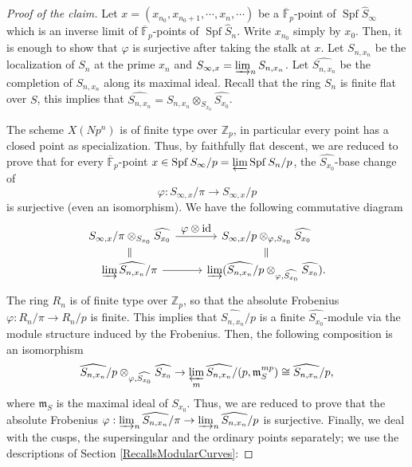 \documentclass[JEP,XML,SOM,Unicode,published]{cedram}
\let\ts\textstyle
\numberwithin{equation}{section}
\theoremstyle{definition}
\newcommand{\bb}[1]{\mathbb{#1}}
\newcommand{\f}[1]{\mathfrak{#1}}
\DeclareMathOperator{\id}{id}
\DeclareMathOperator{\Spf}{Spf}
\newcommand{\mc}[1]{X(Np^{#1})}
\begin{document}
\begin{proof}[Proof of the claim]
Let $x=(x_{n_0}, x_{n_0+1}, \cdots, x_n ,\cdots)$ be a $\overline{\bb{F}}_p$-point of $\Spf \widehat{S}_{\infty}$ which is an inverse limit of $\overline{\bb{F}}_p$-points of $\Spf \widehat{S}_n$. Write $x_{n_0}$ simply by $x_0$. Then, it is enough to show that $\varphi$ is surjective after taking the stalk at $x$. Let $S_{n,x_n}$ be the localization of $S_n$ at the prime $x_n$ and $S_{\infty, x}=\varinjlim_n S_{n, x_n}$. Let $\widehat{S_{n,x_n}}$ be the completion of $S_{n,x_n}$ along its maximal ideal. Recall that the ring $S_{n}$ is finite flat over $S$, this implies that $\widehat{S_{n,x_n}}= S_{n,x_n}\otimes_{S_{x_0}} \widehat{S_{x_0}}$.

The scheme $\mc{n}$ is of finite type over $\bb{Z}_p$, in particular every point has a closed point as specialization. Thus, by faithfully flat descent, we are reduced to prove that for every $\overline{\bb{F}}_p$-point $x \in \Spf S_\infty/p= \varprojlim \Spf S_n/p$, the $\widehat{S_{x_0}}$-base change of\vspace*{-3pt}
\[
\varphi: S_{\infty,x}/\pi\to S_{\infty,x}/p
\]
is surjective (even an isomorphism). We have the following commutative diagram
\begin{equation*}
\begin{tikzcd}[row sep=small]
S_{\infty,x}/\pi \otimes_{S_{x_{0}}}\widehat{S_{x_{0}}} \arrow[r,"\ts \varphi\otimes \id"] & S_{\infty,x}/p \otimes_{\varphi, S_{x_{0}}} \widehat{S_{x_{0}}} \\
\varinjlim \widehat{S_{n,x_n}}/\pi \arrow[r] \arrow[u,equal]& \varinjlim(\widehat{S_{n,x_n}}/p \otimes_{\varphi, \widehat{S_{x_{0}}}} \widehat{S_{x_{0}}}) \arrow[u,equal].
\end{tikzcd}
\end{equation*}
The ring $R_{n}$ is of finite type over $\bb{Z}_{p}$, so that the absolute Frobenius $\varphi: R_{n}/\pi \to R_{n}/p $ is finite. This implies that $\widehat{S_{n,x_n}}/p$ is a finite $\widehat{S_{x_0}}$-module via the module structure induced by the Frobenius. Then, the following composition is an isomorphism
\[
\widehat{S_{n,x_n}}/p \otimes_{\varphi, \widehat{S_{x_{0}}}} \widehat{S_{x_0}}\to \varprojlim_m \widehat{S_{n,x_n}}/(p , \f{m}^{mp}_{S}) \cong\widehat{S_{n,x_n}}/p ,
\]
where $\f{m}_S$ is the maximal ideal of $S_{x_{0}}$.
Thus, we are reduced to prove that the absolute Frobenius $\varphi: \varinjlim_n \widehat{S_{n,x_n}}/\pi \to \varinjlim_n \widehat{S_{n,x_n}}/p $ is surjective. Finally, we deal with the cusps, the supersingular and the ordinary points separately; we use the descriptions of Section \ref{RecallsModularCurves}:


\end{proof}
\end{document}
